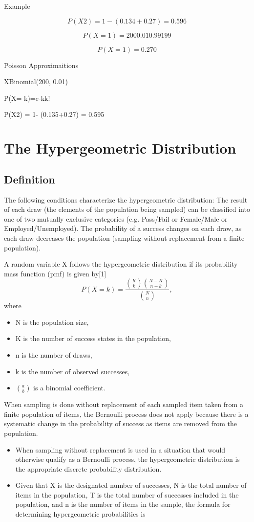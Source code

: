 \documentclass[12pt]{report}
\begin{document}
{{Example

\[P(X2) = 1- (0.134+0.27) = 0.596\]

\[P(X=1) = 2000.010.99199\]

\[P(X=1) = 0.270\]


Poisson Approximaitions


XBinomial(200, 0.01) 


P(X= k)=e-kk!




P(X2) = 1- (0.135+0.27) = 0.595



\section{The Hypergeometric Distribution }
\subsection{Definition}

The following conditions characterize the hypergeometric distribution:
The result of each draw (the elements of the population being sampled) can be classified into one of two mutually exclusive categories (e.g. Pass/Fail or Female/Male or Employed/Unemployed).
The probability of a success changes on each draw, as each draw decreases the population (sampling without replacement from a finite population).

A random variable X follows the hypergeometric distribution if its probability mass function (pmf) is given by[1]
\[ P(X = k) = \frac{\binom{K}{k} \binom{N - K}{n-k}}{\binom{N}{n}},\]
where
\begin{itemize}
	\item N is the population size,
	\item K is the number of success states in the population,
	\item n is the number of draws,
	\item k is the number of observed successes,
	\item $\textstyle {a \choose b}$ is a binomial coefficient.
\end{itemize}



When sampling is done without replacement of each sampled item taken from a finite population of items, the
Bernoulli process does not apply because there is a systematic change in the probability of success as items are
removed from the population. 


\begin{itemize}
	\item	When sampling without replacement is used in a situation that would otherwise
	qualify as a Bernoulli process, the hypergeometric distribution is the appropriate discrete probability distribution.
	\item	Given that X is the designated number of successes, N is the total number of items in the population, T is
	the total number of successes included in the population, and n is the number of items in the sample, the formula
	for determining hypergeometric probabilities is
\end{itemize}


}}
\end{document}
